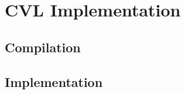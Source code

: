 \section{CVL Implementation}
\label{sec:implementation}

\subsection{Compilation}

\subsection{Implementation}
